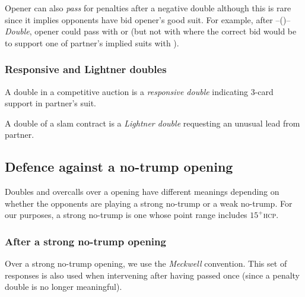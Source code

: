 \documentclass[a4paper,article,oneside]{memoir}
\newcommand{\hcp}{\textsc{hcp}}
\begin{document}
Opener can also \emph{pass} for penalties after a negative double
although this is rare since it implies opponents have bid opener's
good suit. For example, after --()--\emph{Double}, opener
could pass with  or 
(but not with  where the correct bid would be
to support one of partner's implied suits with ).

\subsubsection{Responsive and Lightner doubles}

A double in a competitive auction is a \emph{responsive double}
indicating 3-card support in partner's suit.

A double of a slam contract is a \emph{Lightner double} requesting an
unusual lead from partner.

\subsection{Defence against a no-trump opening}

Doubles and overcalls over a  opening have different meanings
depending on whether the opponents are playing a strong no-trump or a
weak no-trump. For our purposes, a strong no-trump is one whose point
range includes $15^+$\hcp.

\subsubsection{After a strong no-trump opening}

Over a strong no-trump opening, we use the \emph{Meckwell}
convention. This set of responses is also used when intervening after
having passed once (since a penalty double is no longer meaningful).
\end{document}
